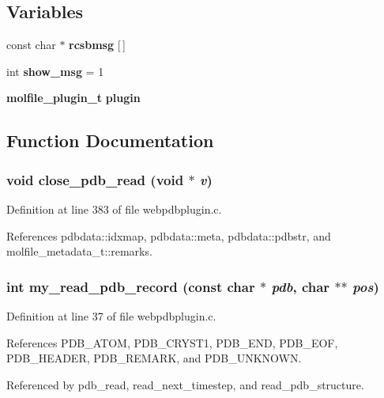 \subsection*{Variables}
\begin{CompactItemize}
\item 
const char $\ast$ {\bf rcsbmsg} [$\,$]
\item 
int {\bf show\_\-msg} = 1
\item 
{\bf molfile\_\-plugin\_\-t} {\bf plugin}
\end{CompactItemize}


\subsection{Function Documentation}
\subsubsection{\setlength{\rightskip}{0pt plus 5cm}void close\_\-pdb\_\-read (void $\ast$ {\em v})\hspace{0.3cm}{\tt  [static]}}\label{webpdbplugin_8c_a9}




Definition at line 383 of file webpdbplugin.c.

References pdbdata::idxmap, pdbdata::meta, pdbdata::pdbstr, and molfile\_\-metadata\_\-t::remarks.
\subsubsection{\setlength{\rightskip}{0pt plus 5cm}int my\_\-read\_\-pdb\_\-record (const char $\ast$ {\em pdb}, char $\ast$$\ast$ {\em pos})\hspace{0.3cm}{\tt  [static]}}\label{webpdbplugin_8c_a3}




Definition at line 37 of file webpdbplugin.c.

References PDB\_\-ATOM, PDB\_\-CRYST1, PDB\_\-END, PDB\_\-EOF, PDB\_\-HEADER, PDB\_\-REMARK, and PDB\_\-UNKNOWN.

Referenced by pdb\_\-read, read\_\-next\_\-timestep, and read\_\-pdb\_\-structure.
